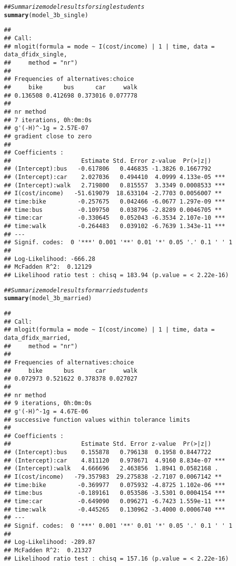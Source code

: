 \documentclass[11pt,letterpaper]{article}\usepackage[]{graphicx}\usepackage[]{color}
\makeatletter
\newcommand{\hlcom}[1]{\textcolor[rgb]{0.678,0.584,0.686}{\textit{#1}}}%
\newcommand{\hlstd}[1]{\textcolor[rgb]{0.345,0.345,0.345}{#1}}%
\newcommand{\hlkwd}[1]{\textcolor[rgb]{0.737,0.353,0.396}{\textbf{#1}}}%
\newenvironment{kframe}{%
 \def\at@end@of@kframe{}%
 \ifinner\ifhmode%
  \def\at@end@of@kframe{\end{minipage}}%
  \begin{minipage}{\columnwidth}%
 \fi\fi%
 \def\FrameCommand##1{\hskip\@totalleftmargin \hskip-\fboxsep
 \colorbox{shadecolor}{##1}\hskip-\fboxsep
     \hskip-\linewidth \hskip-\@totalleftmargin \hskip\columnwidth}%
 \MakeFramed {\advance\hsize-\width
   \@totalleftmargin\z@ \linewidth\hsize
   \@setminipage}}%
 {\par\unskip\endMakeFramed%
 \at@end@of@kframe}
\newenvironment{knitrout}{}{} %
\makeatother
\begin{document}
\begin{enumerate}[label=\alph*., leftmargin=*]
\begin{enumerate}[label=\roman*.]
\begin{knitrout}
\color{fgcolor}\begin{kframe}
\begin{alltt}
\hlcom{## Summarize model results for single students}
\hlkwd{summary}\hlstd{(model_3b_single)}
\end{alltt}
\begin{verbatim}
## 
## Call:
## mlogit(formula = mode ~ I(cost/income) | 1 | time, data = data_dfidx_single, 
##     method = "nr")
## 
## Frequencies of alternatives:choice
##     bike      bus      car     walk 
## 0.136508 0.412698 0.373016 0.077778 
## 
## nr method
## 7 iterations, 0h:0m:0s 
## g'(-H)^-1g = 2.57E-07 
## gradient close to zero 
## 
## Coefficients :
##                    Estimate Std. Error z-value  Pr(>|z|)    
## (Intercept):bus   -0.617806   0.446835 -1.3826 0.1667792    
## (Intercept):car    2.027036   0.494410  4.0999 4.133e-05 ***
## (Intercept):walk   2.719800   0.815557  3.3349 0.0008533 ***
## I(cost/income)   -51.619079  18.633104 -2.7703 0.0056007 ** 
## time:bike         -0.257675   0.042466 -6.0677 1.297e-09 ***
## time:bus          -0.109750   0.038796 -2.8289 0.0046705 ** 
## time:car          -0.330645   0.052043 -6.3534 2.107e-10 ***
## time:walk         -0.264483   0.039102 -6.7639 1.343e-11 ***
## ---
## Signif. codes:  0 '***' 0.001 '**' 0.01 '*' 0.05 '.' 0.1 ' ' 1
## 
## Log-Likelihood: -666.28
## McFadden R^2:  0.12129 
## Likelihood ratio test : chisq = 183.94 (p.value = < 2.22e-16)
\end{verbatim}
\begin{alltt}
\hlcom{## Summarize model results for married students}
\hlkwd{summary}\hlstd{(model_3b_married)}
\end{alltt}
\begin{verbatim}
## 
## Call:
## mlogit(formula = mode ~ I(cost/income) | 1 | time, data = data_dfidx_married, 
##     method = "nr")
## 
## Frequencies of alternatives:choice
##     bike      bus      car     walk 
## 0.072973 0.521622 0.378378 0.027027 
## 
## nr method
## 9 iterations, 0h:0m:0s 
## g'(-H)^-1g = 4.67E-06 
## successive function values within tolerance limits 
## 
## Coefficients :
##                    Estimate Std. Error z-value  Pr(>|z|)    
## (Intercept):bus    0.155878   0.796138  0.1958 0.8447722    
## (Intercept):car    4.811120   0.978671  4.9160 8.834e-07 ***
## (Intercept):walk   4.666696   2.463856  1.8941 0.0582168 .  
## I(cost/income)   -79.357983  29.275838 -2.7107 0.0067142 ** 
## time:bike         -0.369977   0.075932 -4.8725 1.102e-06 ***
## time:bus          -0.189161   0.053586 -3.5301 0.0004154 ***
## time:car          -0.649090   0.096271 -6.7423 1.559e-11 ***
## time:walk         -0.445265   0.130962 -3.4000 0.0006740 ***
## ---
## Signif. codes:  0 '***' 0.001 '**' 0.01 '*' 0.05 '.' 0.1 ' ' 1
## 
## Log-Likelihood: -289.87
## McFadden R^2:  0.21327 
## Likelihood ratio test : chisq = 157.16 (p.value = < 2.22e-16)
\end{verbatim}
\end{kframe}
\end{knitrout}


\end{enumerate}
\end{enumerate}
\end{document}
